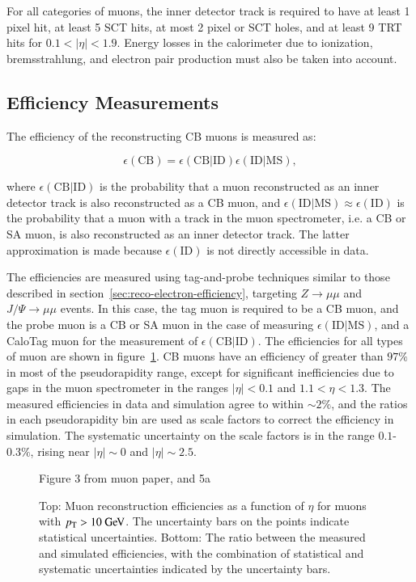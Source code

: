 For all categories of muons, the inner detector track is required to have at least 1 pixel hit, at least 5 SCT hits, at most 2 pixel or SCT holes, and at least 9 TRT hits for $0.1<|\eta|<1.9$. Energy losses in the calorimeter due to ionization, bremsstrahlung, and electron pair production must also be taken into account. 

\subsection{Efficiency Measurements}\label{sec:reco-muon-efficiency}
The efficiency of the reconstructing CB muons is measured as:

\begin{equation}
	\epsilon(\mathrm{CB}) = \epsilon(\mathrm{CB}|\mathrm{ID}) \epsilon(\mathrm{ID}|\mathrm{MS}),
\end{equation}

where $\epsilon(\mathrm{CB}|\mathrm{ID})$ is the probability that a muon reconstructed as an inner detector track is also reconstructed as a CB muon, and $\epsilon(\mathrm{ID}|\mathrm{MS})\approx \epsilon(\mathrm{ID})$ is the probability that a muon with a track in the muon spectrometer, i.e. a CB or SA muon, is also reconstructed as an inner detector track. The latter approximation is made because $\epsilon(\mathrm{ID})$ is not directly accessible in data. 

The efficiencies are measured using tag-and-probe techniques similar to those described in section~\ref{sec:reco-electron-efficiency}, targeting $Z\rightarrow\mu\mu$ and $J/\Psi\rightarrow\mu\mu$ events. In this case, the tag muon is required to be a CB muon, and the probe muon is a CB or SA muon in the case of measuring $\epsilon(\mathrm{ID}|\mathrm{MS})$, and a CaloTag muon for the measurement of $\epsilon(\mathrm{CB}|\mathrm{ID})$. The efficiencies for all types of muon are shown in figure~\ref{fig:reco-muon-efficiency}. CB muons have an efficiency of greater than $97\%$ in most of the pseudorapidity range, except for significant inefficiencies due to gaps in the muon spectrometer in the ranges $|\eta|<0.1$ and $1.1<\eta<1.3$. The measured efficiencies in data and simulation agree to within $\sim2\%$, and the ratios in each pseudorapidity bin are used as scale factors to correct the efficiency in simulation. The systematic uncertainty on the scale factors is in the range $0.1$-$0.3\%$, rising near $|\eta|\sim 0$ and $|\eta|\sim 2.5$.

\begin{figure}[htbp]
	\centering
	Figure 3 from muon paper, and 5a
	\caption{Top: Muon reconstruction efficiencies as a function of $\eta$ for muons with $\pt>10 \GeV$. The uncertainty bars on the points indicate statistical uncertainties. Bottom: The ratio between the measured and simulated efficiencies, with the combination of statistical and systematic uncertainties indicated by the uncertainty bars.}
	\label{fig:reco-muon-efficiency}
\end{figure}


